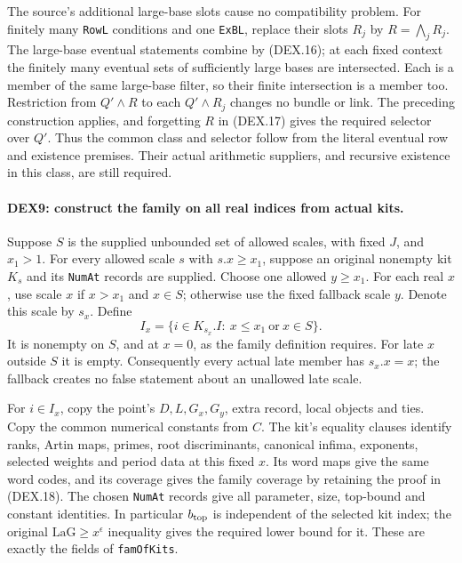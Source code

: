 The source's additional large-base slots cause no compatibility problem.
For finitely many \texttt{RowL} conditions and one \texttt{ExBL},
replace their slots $R_j$ by $R=\bigwedge_jR_j$. The large-base
eventual statements combine by (DEX.16); at each fixed context the
finitely many eventual sets of sufficiently large bases are intersected.
Each is a member of the same large-base filter, so their finite
intersection is a member too. Restriction from $Q'\wedge R$
to each $Q'\wedge R_j$ changes no bundle or link. The preceding
construction applies, and forgetting $R$ in (DEX.17) gives the required
selector over $Q'$. Thus the common class and selector follow from the
literal eventual row and existence premises. Their actual arithmetic
suppliers, and recursive existence in this class, are still required.

\paragraph{DEX9: construct the family on all real indices from actual kits.}
\label{claim:DEX9}
Suppose $S$ is the supplied unbounded set of allowed scales, with
fixed $J$, and $x_1>1$. For every allowed scale $s$ with
$s.x\ge x_1$, suppose an original nonempty kit $K_s$ and its
\texttt{NumAt} records are supplied. Choose one allowed $y\ge x_1$.
For each real $x$, use scale $x$ if $x>x_1$ and $x\in S$;
otherwise use the fixed fallback scale $y$. Denote this scale by $s_x$.
Define
\[
 I_x=\{i\in K_{s_x}.I:\ x\le x_1\ \text{or}\ x\in S\}.    \tag{DEX.18}
\]
It is nonempty on $S$, and at $x=0$, as the family definition requires.
For late $x$ outside $S$ it is empty. Consequently every actual late
member has $s_x.x=x$; the fallback creates no false statement about
an unallowed late scale.

For $i\in I_x$, copy the point's $D,L,G_x,G_y$, extra record,
local objects and ties. Copy the common numerical constants from $C$.
The kit's equality clauses identify ranks, Artin maps, primes, root
discriminants, canonical infima, exponents, selected weights and
period data at this fixed $x$. Its word maps give the same word codes,
and its coverage gives the family coverage by retaining the proof in
(DEX.18). The chosen \texttt{NumAt} records give all parameter, size,
top-bound and constant identities. In particular $b_{\rm top}$ is
independent of the selected kit index; the original
$\mathrm{LaG}\ge x^\epsilon$ inequality gives the required lower
bound for it. These are exactly the fields of \texttt{famOfKits}.

